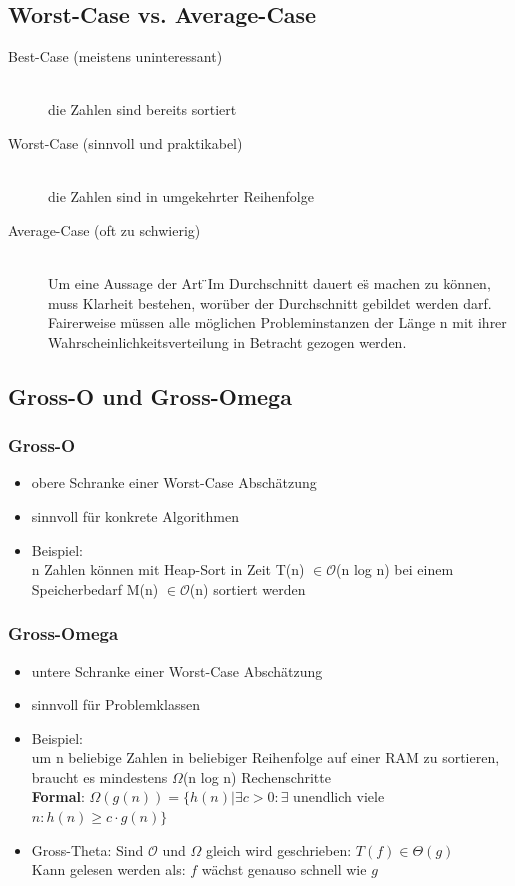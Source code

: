 \documentclass[a4paper,10pt]{article}
\newcommand{\Bold}[1]{\textbf{#1}} %
\begin{document}
\subsection{Worst-Case vs. Average-Case}
\begin{description}
		\item[Best-Case (meistens uninteressant)] \hfill \\
			die Zahlen sind bereits sortiert
		\item[Worst-Case (sinnvoll und praktikabel)] \hfill \\
			die Zahlen sind in umgekehrter Reihenfolge
		\item[Average-Case (oft zu schwierig)] \hfill \\
			Um eine Aussage der Art \"{ }Im Durchschnitt dauert es\"{ }  machen zu k\"onnen, muss Klarheit bestehen, wor\"uber der Durchschnitt gebildet werden darf. Fairerweise m\"ussen alle m\"oglichen Probleminstanzen der L\"ange n mit ihrer Wahrscheinlichkeitsverteilung in Betracht gezogen werden.
\end{description}

\subsection{Gross-O und Gross-Omega}
\subsubsection{Gross-O}
\begin{itemize}
	\item obere Schranke einer Worst-Case Absch\"atzung
	\item sinnvoll f\"ur konkrete Algorithmen
	\item Beispiel: \\
		n Zahlen k\"onnen mit Heap-Sort in Zeit T(n) $\in \mathcal{O}$(n log n) bei einem
Speicherbedarf M(n) $\in \mathcal{O}$(n) sortiert werden
\end{itemize}
\subsubsection{Gross-Omega}
\begin{itemize}
	\item untere Schranke einer Worst-Case Absch\"atzung
	\item sinnvoll f\"ur Problemklassen
	\item Beispiel: \\
		um n beliebige Zahlen in beliebiger Reihenfolge auf einer RAM zu sortieren, braucht es mindestens $\Omega$(n log n) Rechenschritte \\
	\Bold {Formal}: $ \Omega (g(n))  = \{  h(n) | \exists c > 0 : \exists $ unendlich viele $n:h(n) \geq c \cdot  g(n) \}$
	\item Gross-Theta: Sind $\mathcal{O}$ und $\Omega$ gleich wird  geschrieben: $T(f) \in \Theta(g)$ \\
	Kann gelesen werden als: \glqq $f$ w\"achst genauso schnell wie $g$\grqq
\end{itemize}
\pagebreak
\end{document}
